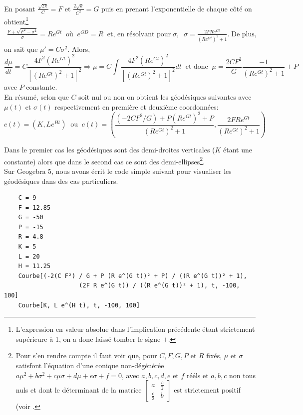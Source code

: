 \documentclass[11pt, letterpaper]{article}
\begin{document}
	En posant $\frac{\sqrt{2k}}{C}=F$ et $\frac{2\sqrt{k}}{C^2}=G$ puis en prenant l'exponentielle de chaque côté on obtient\footnote{L'expression en valeur absolue dans l'implication précédente étant strictement supérieure à 1, on a donc laissé tomber le signe $\pm$.}
	\begin{align*}
	    \frac{F+\sqrt{F^2-\sigma^2}}{\sigma}=Re^{Gt}\;\;\text{où}\;\; e^{GD}=R\;\;\text{et, en résolvant pour}\;\sigma,\;\;\sigma=\frac{2FRe^{Gt}}{(Re^{Gt})^2+1}.\;\text{De plus,}
	\end{align*}
	on sait que $\mu'=C\sigma^2$. Alors,
	\begin{equation*}
	\frac{d\mu}{dt}=C\frac{4F^2(Re^{Gt})^2}{\left[(Re^{Gt})^2+1\right]^2}\Longrightarrow\mu=C\int\frac{4F^2(Re^{Gt})^2}{\left[(Re^{Gt})^2+1\right]^2}dt\;\;\text{et donc}\;\;\mu=\frac{2CF^2}{G}\frac{-1}{(Re^{Gt})^2+1}+P
	\end{equation*}
	avec $P$ constante.\\
	
	En résumé, selon que $C$ soit nul ou non on obtient  les géodésiques suivantes avec $\mu(t)$ et $\sigma(t)$ respectivement en première et deuxième coordonnées:
	\begin{equation*}
	    c(t)=\left(K, Le^{Ht}\right)\;\;\text{ou}\;\;c(t)=\left(\frac{\left(-2CF^2/G\right)+P(Re^{Gt})^2+P}{(Re^{Gt})^2+1}, \frac{2FRe^{Gt}}{(Re^{Gt})^2+1}\right)
	\end{equation*}
	
	Dans le premier cas les géodésiques sont des demi-droites verticales ($K$ étant une constante) alors que dans le second cas ce sont des demi-ellipses\footnote{Pour s'en rendre compte il faut voir que, pour $C, F, G, P$ et $R$ fixés, $\mu$ et $\sigma$ satisfont l'équation d'une conique non-dégénérée $a\mu^2+b\sigma^2+c\mu\sigma+d\mu+e\sigma+f=0$, avec $a, b, c, d, e$ et $f$ rééls et $a, b, c$ non tous nuls et dont le déterminant de la matrice $\begin{bmatrix}
	    a & \frac{c}{2}
	    \\
	    \frac{c}{2} & b
	    \end{bmatrix}$ est strictement positif (voir \cite[section 1.3]{brannan1999geometry}.}.\\
	
	Sur Geogebra 5, nous avons écrit le code simple suivant pour visualiser les géodésiques dans des cas particuliers.
	\begin{verbatim}
	C = 9
	F = 12.85
	G = -50
	P = -15
	R = 4.8
	K = 5
	L = 20
	H = 11.25
	Courbe[(-2(C F²) / G + P (R e^(G t))² + P) / ((R e^(G t))² + 1), 
	                 (2F R e^(G t)) / ((R e^(G t))² + 1), t, -100, 100]
	Courbe[K, L e^(H t), t, -100, 100]
	\end{verbatim}    
	
\end{document}

